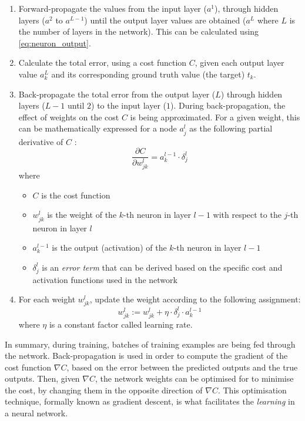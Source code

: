 \begin{enumerate}
    \item Forward-propagate the values from the input layer ($a^1$), through hidden layers ($a^2$ to $a^{L-1}$) until the output layer values are obtained ($a^L$ where $L$ is the number of layers in the network). This can be calculated using \cref{eq:neuron_output}.
    
    \item Calculate the total error, using a cost function $C$, given each output layer value $a^L_k$ and its corresponding ground truth value (the target) $t_k$.
    
    \item Back-propagate the total error from the output layer ($L$) through hidden layers ($L-1$ until $2$) to the input layer ($1$). During back-propagation, the effect of weights on the cost $C$ is being approximated. For a given weight, this can be mathematically expressed for a node $a^l_j$ as the following partial derivative of $C$ \cite{nielsenneural}:
    \begin{equation*}
        \frac{\partial C}{\partial w^l_{jk}} = a^{l-1}_k \cdot \delta^l_j
    \end{equation*}
    where
    \begin{itemize}
        \item $C$ is the cost function
        \item $w^l_{jk}$ is the weight of the $k$-th neuron in layer $l-1$ with respect to the $j$-th neuron in layer $l$
        \item $a^{l-1}_k$ is the output (activation) of the $k$-th neuron in layer $l-1$
        \item $\delta^l_j$ is an \textit{error term} that can be derived based on the specific cost and activation functions used in the network
    \end{itemize}
    
    \item For each weight $w^l_{jk}$, update the weight according to the following assignment\cite{nielsenneural}\cite{thomas_nn_slides}:
    \begin{equation*}
        w^l_{jk} := w^l_{jk} + \eta \cdot \delta^l_j \cdot a^{l-1}_k
    \end{equation*}
    where $\eta$ is a constant factor called learning rate.
\end{enumerate}

\par
In summary, during training, batches of training examples are being fed through the network. Back-propagation is used in order to compute the gradient of the cost function $\nabla C$, based on the error between the predicted outputs and the true outputs. Then, given $\nabla C$, the network weights can be optimised for to minimise the cost, by changing them in the opposite direction of $\nabla C$. This optimisation technique, formally known as gradient descent, is what facilitates the \textit{learning} in a neural network.

